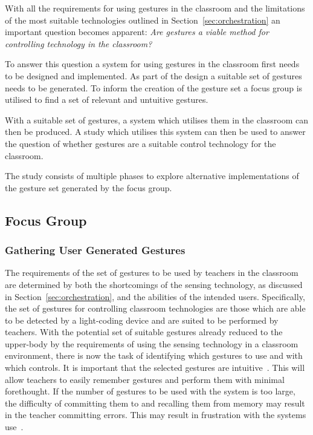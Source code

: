 \documentclass[link]{IWCOMP}
\begin{document}
With all the requirements for using gestures in the classroom and the limitations of the most suitable technologies outlined in Section~\ref{sec:orchestration} an important question becomes apparent:
\emph{Are gestures a viable method for controlling technology in the classroom?}

To answer this question a system for using gestures in the classroom first needs to be designed and implemented.
As part of the design a suitable set of gestures needs to be generated.
To inform the creation of the gesture set a focus group is utilised to find a set of relevant and untuitive gestures.

With a suitable set of gestures, a system which utilises them in the classroom can then be produced.
A study which utilises this system can then be used to answer the question of whether gestures are a suitable control technology for the classroom.

The study consists of multiple phases to explore alternative implementations of the gesture set generated by the focus group.


\subsection{Focus Group }
\label{subsec:focusGroup}



\subsubsection{Gathering User Generated Gestures} 
\label{subsec:gatheringGestures}


The requirements of the set of gestures to be used by teachers in the classroom are determined by both the shortcomings of the sensing technology, as discussed in Section~\ref{sec:orchestration}, and the abilities of the intended users.
Specifically, the set of gestures for controlling classroom technologies are those which are able to be detected by a light-coding device and are suited to be performed by teachers.
With the potential set of suitable gestures already reduced to the upper-body by the requirements of using the sensing technology in a classroom environment, there is now the task of identifying which gestures to use and with which controls.
It is important that the selected gestures are intuitive~\cite{Cohen,Wachs2011}.
This will allow teachers to easily remember gestures and perform them with minimal forethought.
If the number of gestures to be used with the system is too large, the difficulty of committing them to and recalling them from memory may result in the teacher committing errors.
This may result in frustration with the systems use~\cite{Mendoza2005}.
\end{document}
